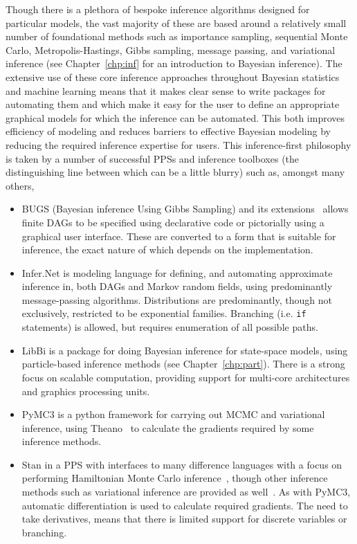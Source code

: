 Though there is a plethora of bespoke inference algorithms designed for particular models, the vast majority of these are based around
a relatively small number of foundational methods such as importance sampling, sequential Monte Carlo,
Metropolis-Hastings, Gibbs sampling, message passing, and variational inference (see Chapter~\ref{chp:inf}
for an introduction to Bayesian inference).
The extensive use of these core inference approaches throughout Bayesian statistics and machine
learning means that it makes clear sense to write packages for automating them and which
make it easy for the user to define an appropriate graphical models for which the inference can be automated.
This both improves efficiency of modeling and reduces barriers to effective Bayesian modeling by reducing the
required inference expertise for users.  This inference-first philosophy is taken by a number of successful PPSs
and inference toolboxes (the distinguishing line between which can be a little blurry) such as, amongst many others,
\begin{itemize}
	\item BUGS (Bayesian inference Using Gibbs Sampling) \citep{spiegelhalter1996bugs} and its 
	extensions~\citep{lunn2000winbugs,plummer2003jags,todeschini2014biips}
	allows finite DAGs to be specified using declarative code or pictorially using a graphical user
	interface.  These are converted to a form that is suitable for inference, the exact nature of which
	depends on the implementation.
	\item Infer.Net \citep{minka_software_2010} is modeling language for defining, and automating approximate inference in,
	both DAGs and Markov random fields, using predominantly message-passing algorithms. Distributions
	are predominantly, though not exclusively, restricted to be exponential families.  Branching (i.e. \texttt{if} statements) 
	is allowed, but requires enumeration of all possible paths. 
	\item LibBi \citep{murray2013bayesian} is a package for doing Bayesian inference for state-space models,
	using particle-based inference methods (see Chapter~\ref{chp:part}).  There is a strong focus on scalable
	computation, providing support for multi-core architectures and graphics processing units.
	\item PyMC3 \citep{salvatier2016probabilistic} is a python framework for carrying out MCMC and variational
	inference, using Theano~\citep{bergstra2010theano} to calculate the gradients required by some inference methods.
	\item Stan \citep{carpenter2015stan} in a PPS with interfaces to many difference languages with a
	focus on performing Hamiltonian Monte Carlo inference~\citep{duane1987hybrid,hoffman2014no}, though
	other inference methods such as variational inference are provided as well~\citep{kucukelbir2015automatic}.
	As with PyMC3, automatic differentiation is used to calculate required gradients.  The need to take
	derivatives, means that there is limited support for discrete variables or branching.
\end{itemize}
